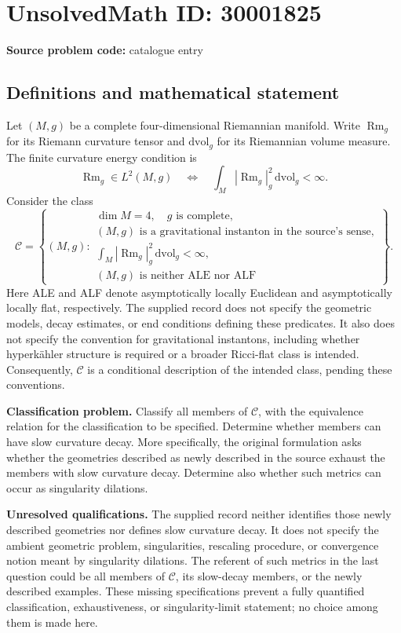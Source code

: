 \documentclass[11pt]{article}
\begin{document}
\section*{UnsolvedMath ID: 30001825}
\textbf{Source problem code:} catalogue entry
\subsection{Definitions and mathematical statement}
Let \((M,g)\) be a complete four-dimensional Riemannian manifold. Write \(\operatorname{Rm}_g\) for its Riemann curvature tensor and \(\mathrm{dvol}_g\) for its Riemannian volume measure. The finite curvature energy condition is
\[
\operatorname{Rm}_g\in L^2(M,g)
\quad\Longleftrightarrow\quad
\int_M |\operatorname{Rm}_g|_g^2\,\mathrm{dvol}_g<\infty.
\]
Consider the class
\[
\mathcal C=\left\{(M,g):\begin{array}{l}
\dim M=4,\quad g\text{ is complete},\\
(M,g)\text{ is a gravitational instanton in the source's sense},\\
\displaystyle\int_M|\operatorname{Rm}_g|_g^2\,\mathrm{dvol}_g<\infty,\\
(M,g)\text{ is neither ALE nor ALF}
\end{array}\right\}.
\]
Here ALE and ALF denote asymptotically locally Euclidean and asymptotically locally flat, respectively. The supplied record does not specify the geometric models, decay estimates, or end conditions defining these predicates. It also does not specify the convention for gravitational instantons, including whether hyperk\"ahler structure is required or a broader Ricci-flat class is intended. Consequently, \(\mathcal C\) is a conditional description of the intended class, pending these conventions.

\textbf{Classification problem.} Classify all members of \(\mathcal C\), with the equivalence relation for the classification to be specified. Determine whether members can have slow curvature decay. More specifically, the original formulation asks whether the geometries described as newly described in the source exhaust the members with slow curvature decay. Determine also whether such metrics can occur as singularity dilations.

\textbf{Unresolved qualifications.} The supplied record neither identifies those newly described geometries nor defines slow curvature decay. It does not specify the ambient geometric problem, singularities, rescaling procedure, or convergence notion meant by singularity dilations. The referent of such metrics in the last question could be all members of \(\mathcal C\), its slow-decay members, or the newly described examples. These missing specifications prevent a fully quantified classification, exhaustiveness, or singularity-limit statement; no choice among them is made here.
\end{document}
